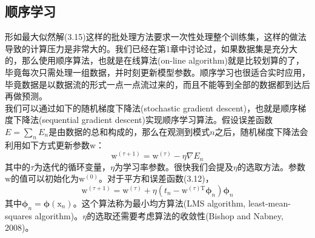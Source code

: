 \documentclass[b5paper]{book}
\numberwithin{equation}{chapter}
\newcommand {\bx} {\boldsymbol{\mathrm{x}}}
\newcommand {\bw} {\boldsymbol{\mathrm{w}}}
\newcommand {\rmT} {\mathrm{T}}
\newcommand {\bfphi} {\boldsymbol{\phi}}
\begin{document}
	\subsection{顺序学习}
	\textnormal{
	形如最大似然解(3.15)这样的批处理方法要求一次性处理整个训练集，这样的做法导致的计算压力是非常大的。我们已经在第1章中讨论过，如果数据集是充分大的，那么使用顺序算法，也就是在线算法(on-line algorithm)就是比较划算的了，毕竟每次只需处理一组数据，并时刻更新模型参数。顺序学习也很适合实时应用，毕竟数据是以数据流的形式一点一点流过来的，而且不能等到全部的数据都到达后再做预测。\\
	\indent 我们可以通过如下的随机梯度下降法(stochastic gradient descent)，也就是顺序梯度下降法(sequential gradient descent)实现顺序学习算法。假设误差函数$E=\sum_n E_n$是由数据的总和构成的，那么在观测到模式$n$之后，随机梯度下降法会利用如下方式更新参数$\bw$：
	\begin{equation}
		\bw^{(\tau+1)} = \bw^{(\tau)} - \eta \nabla E_n
	\end{equation}
	其中的$\tau$为迭代的循环变量，$\eta$为学习率参数。很快我们会提及$\eta$的选取方法。参数$\bw$的值可以初始化为$\bw^{(0)}$。对于平方和误差函数(3.12)，
	\begin{equation}
		\bw^{(\tau+1)} = \bw^{(\tau)}+\eta(t_n - \bw^{(\tau)\rmT} \bfphi_n)\bfphi_n
	\end{equation}
	其中$\bfphi_n = \bfphi(\bx_n)$。这个算法称为最小均方算法(LMS algorithm, least-mean-squares algorithm)。$\eta$的选取还需要考虑算法的收敛性(Bishop and Nabney, 2008)。
	}
\end{document}
